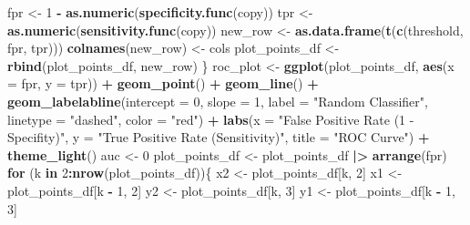 \documentclass[
]{article}
\newenvironment{Shaded}{\begin{snugshade}}{\end{snugshade}}
\newcommand{\AttributeTok}[1]{\textcolor[rgb]{0.13,0.29,0.53}{#1}}
\newcommand{\ControlFlowTok}[1]{\textcolor[rgb]{0.13,0.29,0.53}{\textbf{#1}}}
\newcommand{\DecValTok}[1]{\textcolor[rgb]{0.00,0.00,0.81}{#1}}
\newcommand{\FunctionTok}[1]{\textcolor[rgb]{0.13,0.29,0.53}{\textbf{#1}}}
\newcommand{\NormalTok}[1]{#1}
\newcommand{\OtherTok}[1]{\textcolor[rgb]{0.56,0.35,0.01}{#1}}
\newcommand{\SpecialCharTok}[1]{\textcolor[rgb]{0.81,0.36,0.00}{\textbf{#1}}}
\newcommand{\StringTok}[1]{\textcolor[rgb]{0.31,0.60,0.02}{#1}}
\begin{document}
\begin{Shaded}
\begin{Highlighting}[]
\NormalTok{        fpr }\OtherTok{\textless{}{-}} \DecValTok{1} \SpecialCharTok{{-}} \FunctionTok{as.numeric}\NormalTok{(}\FunctionTok{specificity.func}\NormalTok{(copy))}
\NormalTok{        tpr }\OtherTok{\textless{}{-}} \FunctionTok{as.numeric}\NormalTok{(}\FunctionTok{sensitivity.func}\NormalTok{(copy))}
\NormalTok{        new\_row }\OtherTok{\textless{}{-}} \FunctionTok{as.data.frame}\NormalTok{(}\FunctionTok{t}\NormalTok{(}\FunctionTok{c}\NormalTok{(threshold, fpr, tpr)))}
        \FunctionTok{colnames}\NormalTok{(new\_row) }\OtherTok{\textless{}{-}}\NormalTok{ cols}
\NormalTok{        plot\_points\_df }\OtherTok{\textless{}{-}} \FunctionTok{rbind}\NormalTok{(plot\_points\_df, new\_row)}
\NormalTok{    \}}
\NormalTok{    roc\_plot }\OtherTok{\textless{}{-}} \FunctionTok{ggplot}\NormalTok{(plot\_points\_df, }\FunctionTok{aes}\NormalTok{(}\AttributeTok{x =}\NormalTok{ fpr, }\AttributeTok{y =}\NormalTok{ tpr)) }\SpecialCharTok{+} 
        \FunctionTok{geom\_point}\NormalTok{() }\SpecialCharTok{+}
        \FunctionTok{geom\_line}\NormalTok{() }\SpecialCharTok{+}
        \FunctionTok{geom\_labelabline}\NormalTok{(}\AttributeTok{intercept =} \DecValTok{0}\NormalTok{, }\AttributeTok{slope =} \DecValTok{1}\NormalTok{, }\AttributeTok{label =} \StringTok{"Random Classifier"}\NormalTok{,}
                        \AttributeTok{linetype =} \StringTok{"dashed"}\NormalTok{, }\AttributeTok{color =} \StringTok{"red"}\NormalTok{) }\SpecialCharTok{+}
        \FunctionTok{labs}\NormalTok{(}\AttributeTok{x =} \StringTok{"False Positive Rate (1 {-} Specifity)"}\NormalTok{,}
             \AttributeTok{y =} \StringTok{"True Positive Rate (Sensitivity)"}\NormalTok{,}
             \AttributeTok{title =} \StringTok{"ROC Curve"}\NormalTok{) }\SpecialCharTok{+}
        \FunctionTok{theme\_light}\NormalTok{()}
\NormalTok{    auc }\OtherTok{\textless{}{-}} \DecValTok{0}
\NormalTok{    plot\_points\_df }\OtherTok{\textless{}{-}}\NormalTok{ plot\_points\_df }\SpecialCharTok{|\textgreater{}}
        \FunctionTok{arrange}\NormalTok{(fpr)}
    \ControlFlowTok{for}\NormalTok{ (k }\ControlFlowTok{in} \DecValTok{2}\SpecialCharTok{:}\FunctionTok{nrow}\NormalTok{(plot\_points\_df))\{}
\NormalTok{        x2 }\OtherTok{\textless{}{-}}\NormalTok{ plot\_points\_df[k, }\DecValTok{2}\NormalTok{]}
\NormalTok{        x1 }\OtherTok{\textless{}{-}}\NormalTok{ plot\_points\_df[k }\SpecialCharTok{{-}} \DecValTok{1}\NormalTok{, }\DecValTok{2}\NormalTok{]}
\NormalTok{        y2 }\OtherTok{\textless{}{-}}\NormalTok{ plot\_points\_df[k, }\DecValTok{3}\NormalTok{]}
\NormalTok{        y1 }\OtherTok{\textless{}{-}}\NormalTok{ plot\_points\_df[k }\SpecialCharTok{{-}} \DecValTok{1}\NormalTok{, }\DecValTok{3}\NormalTok{]}

\end{Highlighting}
\end{Shaded}
\end{document}
